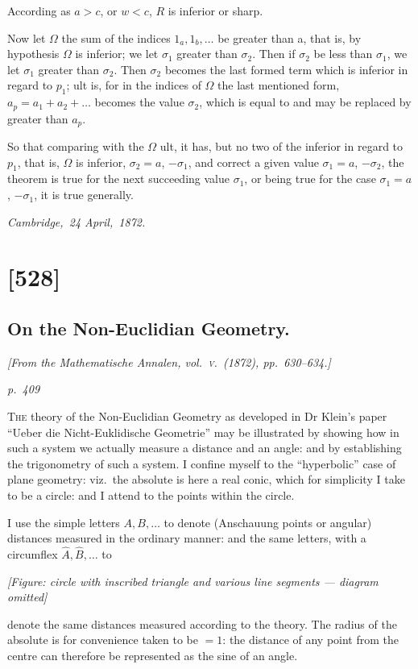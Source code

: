\documentclass[11pt,a4paper]{book}
\begin{document}
According as $a > c$, or $w < c$, $R$ is inferior or sharp.

Now let $\Omega$ the sum of the indices $1_a, 1_b, \ldots$ be greater than a, that is, by hypothesis
$\Omega$ is inferior; we let $\sigma_1$ greater than $\sigma_2$.  Then if $\sigma_2$ be less than $\sigma_1$, we let $\sigma_1$
greater than $\sigma_2$.  Then $\sigma_2$ becomes the last formed term which is inferior in
regard to $p_1$; ult is, for in the indices of $\Omega$ the last mentioned form, $a_p = a_1 + a_2 + \ldots$
becomes the value $\sigma_2$, which is equal to and may be replaced by greater than $a_p$.

So that comparing with the $\Omega$ ult, it has, but no two of the inferior in regard to $p_1$,
that is, $\Omega$ is inferior, $\sigma_2 = a$, $-\sigma_1$, and correct a given value $\sigma_1 = a$, $-\sigma_2$, the theorem is true
for the next succeeding value $\sigma_1$, or being true for the case $\sigma_1 = a$, $-\sigma_1$, it is true
generally.

\noindent\textit{Cambridge,\ 24 April,\ 1872.}

\clearpage

\section{[528]}
\subsection{On the Non-Euclidian Geometry.}

\begin{center}
\textit{[From the Mathematische Annalen, vol.~\textsc{v}.\ (1872), pp.~630--634.]}
\end{center}

\textit{p.~409}

\noindent
\textsc{The} theory of the Non-Euclidian Geometry as developed in Dr Klein's paper
``Ueber die Nicht-Euklidische Geometrie'' may be illustrated by showing how in such
a system we actually measure a distance and an angle: and by establishing the
trigonometry of such a system.  I confine myself to the ``hyperbolic'' case of plane
geometry: viz.\ the absolute is here a real conic, which for simplicity I take to be a
circle: and I attend to the points within the circle.

I use the simple letters $A, B, \ldots$ to denote (Anschauung points or angular) distances measured
in the ordinary manner: and the same letters, with a circumflex $\hat{A}, \hat{B}, \ldots$ to
\begin{center}
\textit{[Figure: circle with inscribed triangle and various line segments --- diagram omitted]}
\end{center}
denote the same distances measured according to the theory.  The radius of the
absolute is for convenience taken to be $= 1$: the distance of any point from the centre
can therefore be represented as the sine of an angle.
\end{document}
